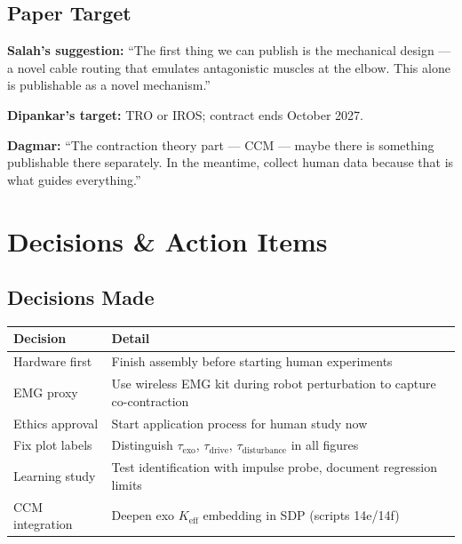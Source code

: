 \documentclass[11pt, a4paper]{article}
\newcommand{\Ke}{K_{\mathrm{eff}}}
\begin{document}
\subsection{Paper Target}

\begin{infobox}
\textbf{Salah's suggestion:} ``The first thing we can publish is the mechanical design ---
a novel cable routing that emulates antagonistic muscles at the elbow.
This alone is publishable as a novel mechanism.''

\textbf{Dipankar's target:} TRO or IROS; contract ends October 2027.

\textbf{Dagmar:} ``The contraction theory part --- CCM --- maybe there is something
publishable there separately. In the meantime, collect human data because that is what
guides everything.''
\end{infobox}

\section{Decisions \& Action Items}

\subsection{Decisions Made}

\begin{center}
{\small
\begin{tabular}{ll}
\toprule
\textbf{Decision} & \textbf{Detail} \\
\midrule
Hardware first & Finish assembly before starting human experiments \\
EMG proxy & Use wireless EMG kit during robot perturbation to capture co-contraction \\
Ethics approval & Start application process for human study now \\
Fix plot labels & Distinguish $\tau_{\mathrm{exo}}$, $\tau_{\mathrm{drive}}$, $\tau_{\mathrm{disturbance}}$ in all figures \\
Learning study & Test identification with impulse probe, document regression limits \\
CCM integration & Deepen exo $\Ke$ embedding in SDP (scripts 14e/14f) \\
\bottomrule
\end{tabular}
}
\end{center}
\end{document}
